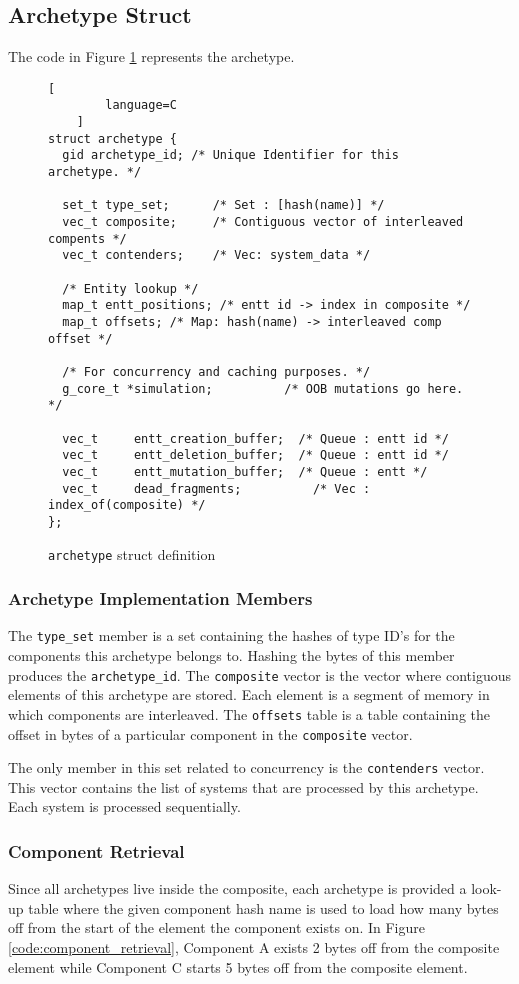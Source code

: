 \subsection{Archetype Struct}
The code in Figure \ref{code:archetype} represents the archetype.

\begin{figure}[htbp]
    \begin{lstlisting}[
        language=C
    ]
struct archetype {
  gid archetype_id; /* Unique Identifier for this archetype. */
  
  set_t type_set;      /* Set : [hash(name)] */
  vec_t composite;     /* Contiguous vector of interleaved compents */
  vec_t contenders;    /* Vec: system_data */
  
  /* Entity lookup */
  map_t entt_positions; /* entt id -> index in composite */
  map_t offsets; /* Map: hash(name) -> interleaved comp offset */
  
  /* For concurrency and caching purposes. */
  g_core_t *simulation;          /* OOB mutations go here. */
  
  vec_t     entt_creation_buffer;  /* Queue : entt id */
  vec_t     entt_deletion_buffer;  /* Queue : entt id */
  vec_t     entt_mutation_buffer;  /* Queue : entt */
  vec_t     dead_fragments;          /* Vec : index_of(composite) */
};
    \end{lstlisting}
    \caption{\texttt{archetype} struct definition}
    \label{code:archetype}
\end{figure}

\subsubsection{Archetype Implementation Members}
The \texttt{type\_set} member is a set containing the hashes of type ID's for the components this archetype belongs to. Hashing the bytes of this member produces the \texttt{archetype\_id}. The \texttt{composite} vector is the vector where contiguous elements of this archetype are stored. Each element is a segment of memory in which components are interleaved. The \texttt{offsets} table is a table containing the offset in bytes of a particular component in the \texttt{composite} vector.

The only member in this set related to concurrency is the \texttt{contenders} vector. This vector contains the list of systems that are processed by this archetype. Each system is processed sequentially. 

\subsubsection{Component Retrieval}
Since all archetypes live inside the composite, each archetype is provided a look-up table where the given component hash name is used to load how many bytes off from the start of the element the component exists on. In Figure \ref{code:component_retrieval}, Component A exists 2 bytes off from the composite element while Component C starts 5 bytes off from the composite element.

